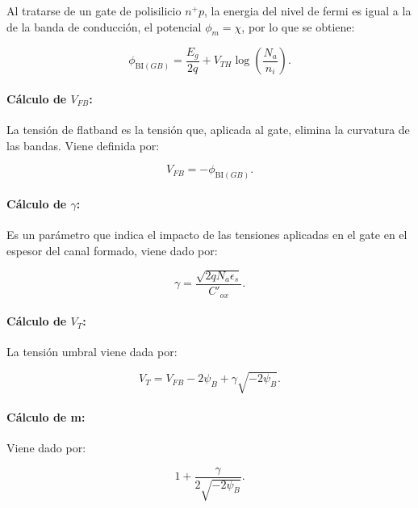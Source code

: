 \documentclass[a4paper, twoside, 10pt, spanish]{article}
\numberwithin{table}{section}
\begin{document}
Al tratarse de un gate de polisilicio $n^{+}p$, la energia del nivel de fermi es igual a la de la banda de conducción, el potencial $\phi_m = \chi$, por lo que se obtiene:

\begin{equation*}
		\phi_{\mathrm{BI}(GB)} =\frac{E_g}{2q} + V_{TH} \log\left(\frac{N_a}{n_i}\right).
\end{equation*} 

\paragraph{Cálculo de $V_{FB}$:}

La tensión de flatband es la tensión que, aplicada al gate, elimina la curvatura de las bandas. Viene definida por: 

\begin{equation*}
	V_{FB} = - \phi_{\mathrm{BI}(GB)}.
\end{equation*}

\paragraph{Cálculo de $\gamma$:}

Es un parámetro que indica el impacto de las tensiones aplicadas en el gate en el espesor del canal formado, viene dado por: 

\begin{equation*}
	\gamma = \frac{\sqrt{2 q N_a \epsilon_s}}{C'_{ox}}.
\end{equation*}

\paragraph{Cálculo de $V_T$:} 

La tensión umbral viene dada por: 

\begin{equation*}
	V_T = V_{FB} - 2 \psi_B + \gamma \sqrt{-2 \psi_B}.
\end{equation*}

\paragraph{Cálculo de m:}

Viene dado por: 

\begin{equation*}
	1 + \frac{\gamma}{2 \sqrt{-2 \psi_B}}.
\end{equation*}
\end{document}

